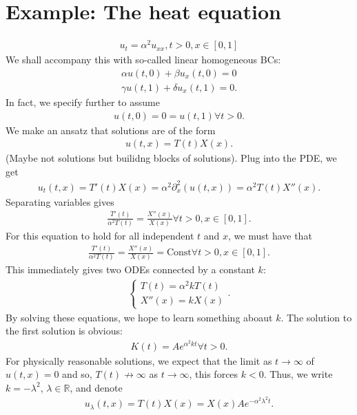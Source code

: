 \documentclass{book}
\theoremstyle{definition}
\newcommand{\p}{\partial}
\newcommand{\R}{\mathbb{R}}
\begin{document}
\section{Example: The heat equation}
\begin{align*}
u_t = \alpha^2 u_{xx}, t>0, x\in[0,1]
\end{align*}
We shall accompany this with so-called linear homogeneous BCs:
\begin{align*}
\alpha u(t,0) + \beta u_x(t,0) = 0\\
\gamma u(t,1) + \delta u_x(t,1) = 0.
\end{align*}
In fact, we specify further to assume
\begin{align*}
u(t,0)=0=u(t,1)\forall t > 0.
\end{align*}
We make an ansatz that solutions are of the form
\begin{align*}
u(t,x) = T(t)X(x).
\end{align*}
(Maybe not solutions but builidng blocks of solutions). Plug into the PDE, we get
\begin{align*}
u_t(t,x) = T'(t)X(x) = \alpha^2\p_x^2(u(t,x)) = \alpha^2 T(t)X''(x). 
\end{align*}
Separating variables gives
\begin{align*}
\frac{T'(t)}{\alpha^2 T(t)} = \frac{X''(x)}{X(x)} \forall t>0, x\in[0,1].
\end{align*} 
For this equation to hold for all independent $t$ and $x$, we must have that 
\begin{align*}
\frac{T'(t)}{\alpha^2 T(t)} = \frac{X''(x)}{X(x)} = \text{Const} \forall t>0, x\in[0,1].
\end{align*}
This immediately gives two ODEs connected by a constant $k$:
\begin{align*}
\begin{cases}
T(t) = \alpha^2 k T(t)\\
X''(x) = kX(x)
\end{cases}.
\end{align*}
By solving these equations, we hope to learn something aboaut $k$. The solution to the first solution is obvious:
\begin{align*}
K(t) = Ae^{\alpha^2 kt} \forall t > 0. 
\end{align*}
For physically reasonable solutions, we expect that the limit as $t\to \infty$ of $u(t,x) = 0$ and so, $T(t)\not\to\infty$ as $t\to\infty$, this forces $k<0$. Thus, we write $k=-\lambda^2$, $\lambda\in\R$, and denote
\begin{align*}
u_\lambda(t,x) = T(t)X(x) = X(x)Ae^{-\alpha^2\lambda^2t}.
\end{align*}
\end{document}
